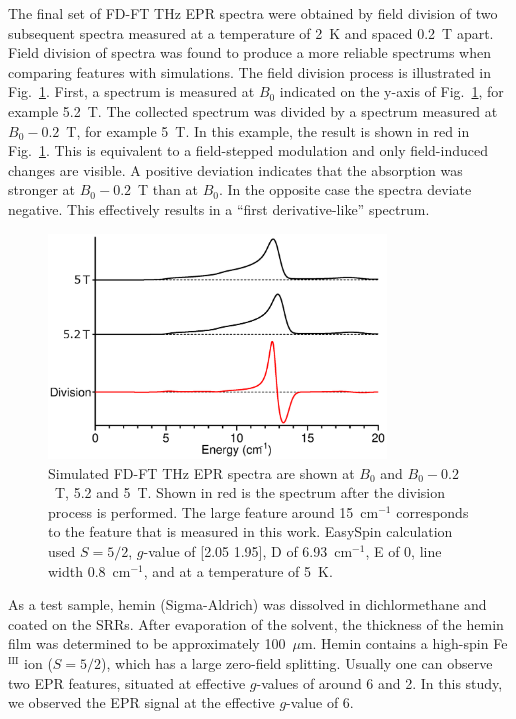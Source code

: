 The final set of FD-FT THz EPR spectra were obtained by field division of two subsequent spectra measured at a temperature of 2~K and spaced 0.2~T apart. Field division of spectra was found to produce a more reliable spectrums when comparing features with simulations. \cite{Schnegg09,Nehrkorn13,NEHRKORN201710} The field division process is illustrated in Fig.~\ref{ch4-fig:FDS}. First, a spectrum is measured at $B_0$ indicated on the y-axis of Fig.~\ref{ch4-fig:FDS}, for example 5.2~T. The collected spectrum was divided by a spectrum measured at $B_0 - 0.2$~T, for example 5~T. In this example, the result is shown in red in Fig.~\ref{ch4-fig:FDS}. This is equivalent to a field-stepped modulation and only field-induced changes are visible. A positive deviation indicates that the absorption was stronger at $B_0 - 0.2$~T than at $B_0$. In the opposite case the spectra deviate negative. This effectively results in a ``first derivative-like'' spectrum.

\begin{figure}[htp]
\centering
  \includegraphics[width=0.8\textwidth]{Kapitel/Ch4-Images/Ch4-ExperimentExplain.eps}
  \caption[FD-FT THz EPR field division of spectra]{Simulated FD-FT THz EPR spectra are shown at $B_0$ and $B_0 - 0.2$~T, 5.2 and 5~T. Shown in red is the spectrum after the division process is performed. The large feature around 15~cm$^{-1}$ corresponds to the feature that is measured in this work. EasySpin calculation used $S=5/2$, $g$-value of [2.05 1.95], D of 6.93~cm$^{-1}$, E of 0, line width 0.8~cm$^{-1}$, and at a temperature of 5~K.}
  \label{ch4-fig:FDS}
\end{figure}

As a test sample, hemin (Sigma-Aldrich) was dissolved in dichlormethane and coated on the SRRs. After evaporation of the solvent, the thickness of the hemin film was determined to be approximately 100~$\mu$m. Hemin contains a high-spin Fe$^\text{III}$ ion ($S = 5/2$), which has a large zero-field splitting. \cite{Nehrkorn15,Johnson66,Marathe73,Lang66} Usually one can observe two EPR features, situated at effective $g$-values of around 6 and 2. \cite{Pilbrow90} In this study, we observed the EPR signal at the effective $g$-value of 6. 

